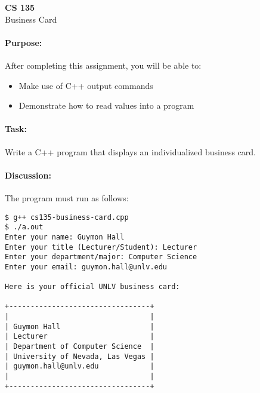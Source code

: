 \documentclass[11pt]{article}
\begin{document}
    \begin{center}

        \large\textbf{CS 135} \\
        Business Card \\

    \end{center}

    \paragraph{Purpose:} After completing this assignment, you will be
    able to:

        \begin{itemize}

            \item Make use of C++ output commands

            \item Demonstrate how to read values into a program

        \end{itemize}

    \paragraph{Task:} Write a C++ program that displays an
    individualized business card.  
    
    \paragraph{Discussion:} The program must run as follows:
    
    \vspace{1.5em}

\begin{verbatim}
$ g++ cs135-business-card.cpp
$ ./a.out
Enter your name: Guymon Hall
Enter your title (Lecturer/Student): Lecturer
Enter your department/major: Computer Science
Enter your email: guymon.hall@unlv.edu

Here is your official UNLV business card:

+---------------------------------+
|                                 |
| Guymon Hall                     |
| Lecturer                        |
| Department of Computer Science  |
| University of Nevada, Las Vegas |
| guymon.hall@unlv.edu            |
|                                 |
+---------------------------------+
\end{verbatim}
    
\end{document}
